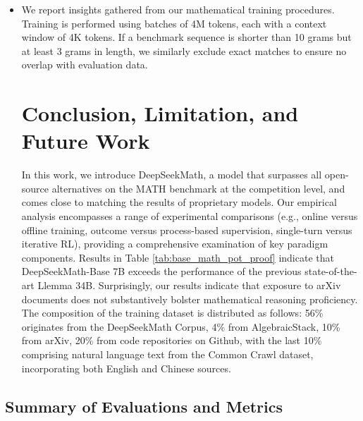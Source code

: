 \begin{itemize}[topsep=0pt]
\begin{itemize}[topsep=0pt]
The automation of formal proofs plays a critical role in ensuring both the accuracy and efficiency of mathematical verification, and has garnered significant attention recently. \end{itemize}

A summary of these methodologies is provided in Table \ref{tab:data_policy}. \item We report insights gathered from our mathematical training procedures. Training is performed using batches of 4M tokens, each with a context window of 4K tokens. If a benchmark sequence is shorter than 10 grams but at least 3 grams in length, we similarly exclude exact matches to ensure no overlap with evaluation data. \section{Conclusion, Limitation, and Future Work} In this work, we introduce DeepSeekMath, a model that surpasses all open-source alternatives on the MATH benchmark at the competition level, and comes close to matching the results of proprietary models. Our empirical analysis encompasses a range of experimental comparisons (e.g., online versus offline training, outcome versus process-based supervision, single-turn versus iterative RL), providing a comprehensive examination of key paradigm components. Results in Table \ref{tab:base_math_pot_proof} indicate that DeepSeekMath-Base 7B exceeds the performance of the previous state-of-the-art Llemma 34B. Surprisingly, our results indicate that exposure to arXiv documents does not substantively bolster mathematical reasoning proficiency. The composition of the training dataset is distributed as follows: 56\% originates from the DeepSeekMath Corpus, 4\% from AlgebraicStack, 10\% from arXiv, 20\% from code repositories on Github, with the last 10\% comprising natural language text from the Common Crawl dataset, incorporating both English and Chinese sources. \end{itemize}

\subsection{Summary of Evaluations and Metrics}

